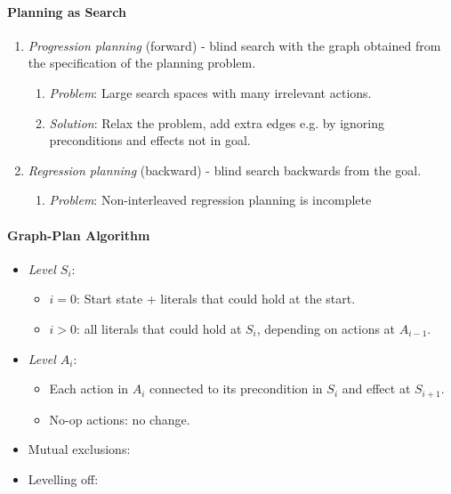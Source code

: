 \documentclass[twocolumn,english]{article}
\begin{document}
\paragraph{Planning as Search}
\begin{enumerate}
\item \emph{Progression planning} (forward) - blind search with the graph
obtained from the specification of the planning problem.
\begin{enumerate}
\item \emph{Problem}: Large search spaces with many irrelevant actions.
\item \emph{Solution}: Relax the problem, add extra edges e.g. by ignoring
preconditions and effects not in goal.
\end{enumerate}
\item \emph{Regression planning} (backward) - blind search backwards from
the goal.
\begin{enumerate}
\item \emph{Problem}: Non-interleaved regression planning is incomplete
\end{enumerate}
\end{enumerate}

\paragraph{Graph-Plan Algorithm}
\begin{itemize}
\item \emph{Level $S_{i}$}:
\begin{itemize}
\item $i=0$: Start state + literals that could hold at the start.
\item $i>0$: all literals that could hold at $S_{i}$, depending on actions
at $A_{i-1}$.
\end{itemize}
\item \emph{Level $A_{i}$}:
\begin{itemize}
\item Each action in $A_{i}$ connected to its precondition in $S_{i}$
and effect at $S_{i+1}$.
\item No-op actions: no change.
\end{itemize}
\item Mutual exclusions:
\item Levelling off:
\end{itemize}
\end{document}
